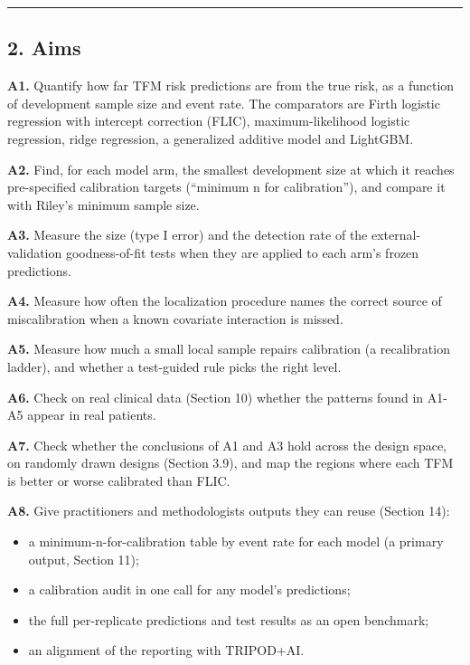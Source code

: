 \documentclass[
  10pt,
]{article}
\providecommand{\tightlist}{%
  \setlength{\itemsep}{0pt}\setlength{\parskip}{0pt}}
\begin{document}
\begin{center}\rule{0.5\linewidth}{0.5pt}\end{center}

\subsection{2. Aims}\label{aims}

\textbf{A1.} Quantify how far TFM risk predictions are from
the true risk, as a function of development sample size and
event rate. The comparators are Firth logistic regression
with intercept correction (FLIC), maximum-likelihood
logistic regression, ridge regression, a generalized
additive model and LightGBM.

\textbf{A2.} Find, for each model arm, the smallest
development size at which it reaches pre-specified
calibration targets (``minimum n for calibration''), and
compare it with Riley's minimum sample size.

\textbf{A3.} Measure the size (type I error) and the
detection rate of the external-validation goodness-of-fit
tests when they are applied to each arm's frozen
predictions.

\textbf{A4.} Measure how often the localization procedure
names the correct source of miscalibration when a known
covariate interaction is missed.

\textbf{A5.} Measure how much a small local sample repairs
calibration (a recalibration ladder), and whether a
test-guided rule picks the right level.

\textbf{A6.} Check on real clinical data (Section 10)
whether the patterns found in A1-A5 appear in real patients.

\textbf{A7.} Check whether the conclusions of A1 and A3 hold
across the design space, on randomly drawn designs (Section
3.9), and map the regions where each TFM is better or worse
calibrated than FLIC.

\textbf{A8.} Give practitioners and methodologists outputs
they can reuse (Section 14):

\begin{itemize}
\tightlist
\item
  a minimum-n-for-calibration table by event rate for each
  model (a primary output, Section 11);
\item
  a calibration audit in one call for any model's
  predictions;
\item
  the full per-replicate predictions and test results as an
  open benchmark;
\item
  an alignment of the reporting with TRIPOD+AI.
\end{itemize}
\end{document}
